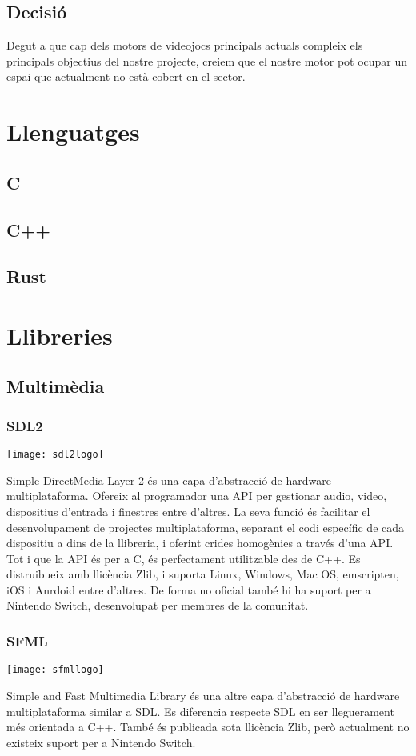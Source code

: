 \subsection{Decisió}
Degut a que cap dels motors de videojocs principals actuals compleix els principals objectius del nostre projecte, creiem que el nostre motor pot ocupar un espai que actualment no està cobert en el sector.
\section{Llenguatges}
\subsection{C}
\subsection{C++}
\subsection{Rust}
\section{Llibreries}
\subsection{Multimèdia}
\subsubsection{SDL2}
\begin{center}
  \texttt{[image: sdl2logo]}
\end{center}
Simple DirectMedia Layer 2 és una capa d'abstracció de hardware multiplataforma. Ofereix al programador una API per gestionar audio, video, dispositius d'entrada i finestres entre d'altres. La seva funció és facilitar el desenvolupament de projectes multiplataforma, separant el codi específic de cada dispositiu a dins de la llibreria, i oferint crides homogènies a través d'una API.
Tot i que la API és per a C, és perfectament utilitzable des de C++. Es distruibueix amb llicència Zlib, i suporta Linux, Windows, Mac OS, emscripten, iOS i Anrdoid entre d'altres. De forma no oficial també hi ha suport per a Nintendo Switch, desenvolupat per membres de la comunitat.
\subsubsection{SFML}
\begin{center}
  \texttt{[image: sfmllogo]}
\end{center}
Simple and Fast Multimedia Library és una altre capa d'abstracció de hardware multiplataforma similar a SDL. Es diferencia respecte SDL en ser lleguerament més orientada a C++. També és publicada sota llicència Zlib, però actualment no existeix suport per a Nintendo Switch.
